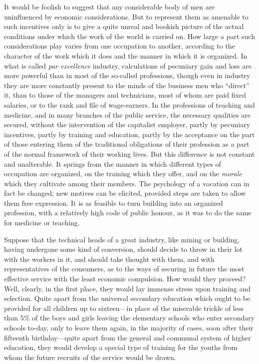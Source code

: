 \documentclass{book}
\begin{document}
It would be foolish to suggest that any considerable body of men are uninfluenced by economic considerations. But to represent them as amenable to such incentives only is to give a quite unreal and bookish picture of the actual conditions under which the work of the world is carried on. How large a part such considerations play varies from one occupation to another, according to the character of the work which it does and the manner in which it is organized. In what is called \emph{par excellence} industry, calculations of pecuniary gain and loss are more powerful than in most of the so-called professions, though even in industry they are more constantly present to the minds of the business men who “direct” it, than to those of the managers and technicians, most of whom are paid fixed salaries, or to the rank and file of wage-earners. In the professions of teaching and medicine, and in many branches of the public service, the necessary qualities are secured, without the intervention of the capitalist employer, partly by pecuniary incentives, partly by training and education, partly by the acceptance on the part of those entering them of the traditional obligations of their profession as a part of the normal framework of their working lives. But this difference is not constant and unalterable. It springs from the manner in which different types of occupation are organized, on the training which they offer, and on the \emph{morale} which they cultivate among their members. The psychology of a vocation can in fact be changed; new motives can be elicited, provided steps are taken to allow them free expression. It is as feasible to turn building into an organized profession, with a relatively high code of public honour, as it was to do the same for medicine or teaching.

Suppose that the technical heads of a great industry, like mining or building, having undergone some kind of conversion, should decide to throw in their lot with the workers in it, and should take thought with them, and with representatives of the consumers, as to the ways of securing in future the most effective service with the least economic compulsion. How would they proceed? Well, clearly, in the first place, they would lay immense stress upon training and selection. Quite apart from the universal secondary education which ought to be provided for all children up to sixteen—in place of the miserable trickle of less than 5\% of the boys and girls leaving the elementary schools who enter secondary schools to-day, only to leave them again, in the majority of cases, soon after their fifteenth birthday—quite apart from the general and communal system of higher education, they would develop a special type of training for the youths from whom the future recruits of the service would be drawn.
\end{document}
